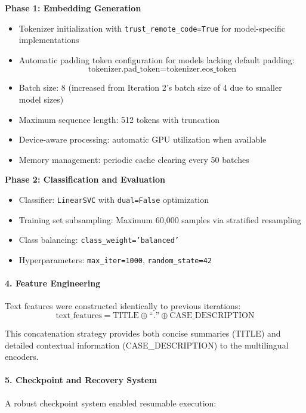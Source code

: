 \documentclass[11pt, titlepage, bibliography=totoc]{scrreprt}
\begin{document}
\textbf{Phase 1: Embedding Generation}
\begin{itemize}
    \item Tokenizer initialization with \texttt{trust\_remote\_code=True} for model-specific implementations
    \item Automatic padding token configuration for models lacking default padding:
    \begin{equation}
    \text{tokenizer.pad\_token} = \text{tokenizer.eos\_token}
    \end{equation}
    \item Batch size: 8 (increased from Iteration 2's batch size of 4 due to smaller model sizes)
    \item Maximum sequence length: 512 tokens with truncation
    \item Device-aware processing: automatic GPU utilization when available
    \item Memory management: periodic cache clearing every 50 batches
\end{itemize}

\textbf{Phase 2: Classification and Evaluation}
\begin{itemize}
    \item Classifier: \texttt{LinearSVC} with \texttt{dual=False} optimization
    \item Training set subsampling: Maximum 60,000 samples via stratified resampling
    \item Class balancing: \texttt{class\_weight='balanced'}
    \item Hyperparameters: \texttt{max\_iter=1000}, \texttt{random\_state=42}
\end{itemize}

\paragraph{4. Feature Engineering}
Text features were constructed identically to previous iterations:
\begin{equation}
\text{text\_features} = \text{TITLE} \oplus \text{``.''}  \oplus \text{CASE\_DESCRIPTION}
\end{equation}

This concatenation strategy provides both concise summaries (TITLE) and detailed contextual information (CASE\_DESCRIPTION) to the multilingual encoders.

\paragraph{5. Checkpoint and Recovery System}
A robust checkpoint system enabled resumable execution:
\end{document}
